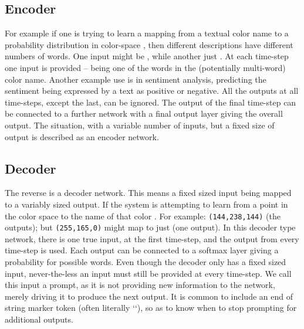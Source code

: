 \documentclass[12pt,parskip]{komatufte}
\begin{document}
\subsection{Encoder}

For example if one is trying to learn a mapping from a textual color name to a probability distribution in color-space , then different descriptions have different numbers of words.
One input might be , while another just .
At each time-step one input is provided -- being one of the words in the (potentially multi-word) color name.
Another example use is in sentiment analysis, predicting the sentiment being expressed by a text as positive or negative.
All the outputs at all time-steps, except the last, can be ignored.
The output of the final time-step can be connected to a further network with a final output layer giving the overall output.
The situation, with a variable number of inputs, but a fixed size of output is described as an encoder network.

\subsection{Decoder}\label{sec:decoder}



The reverse is a decoder network.
This means a fixed sized input being mapped to a variably sized output.
If the system is attempting to learn from a point in the color space to the name of that color .
For example: \texttt{(144,238,144)}  (the outputs); but \texttt{(255,165,0)} might map to just  (one output).
In this decoder type network, there is one true input, at the first time-step, and the output from every time-step is used.
Each output can be connected to a softmax layer giving a probability for possible words.
Even though the decoder only has a fixed sized input,
never-the-less  an input must still be provided at every time-step.
We call this input a prompt, as it is not providing new information to the network, merely driving it to produce the next output.
It is common to include an end of string marker token (often literally ``),
so as to know when to stop prompting for additional outputs.
\end{document}
